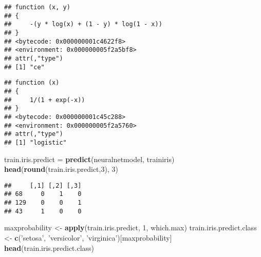 \documentclass[
]{book}
\newenvironment{Shaded}{\begin{snugshade}}{\end{snugshade}}
\newcommand{\DecValTok}[1]{\textcolor[rgb]{0.00,0.00,0.81}{#1}}
\newcommand{\KeywordTok}[1]{\textcolor[rgb]{0.13,0.29,0.53}{\textbf{#1}}}
\newcommand{\NormalTok}[1]{#1}
\newcommand{\OperatorTok}[1]{\textcolor[rgb]{0.81,0.36,0.00}{\textbf{#1}}}
\newcommand{\StringTok}[1]{\textcolor[rgb]{0.31,0.60,0.02}{#1}}
\begin{document}
\begin{Shaded}
\end{Shaded}

\begin{verbatim}
## function (x, y) 
## {
##     -(y * log(x) + (1 - y) * log(1 - x))
## }
## <bytecode: 0x000000001c4622f8>
## <environment: 0x000000005f2a5bf8>
## attr(,"type")
## [1] "ce"
\end{verbatim}

\begin{Shaded}
\end{Shaded}

\begin{verbatim}
## function (x) 
## {
##     1/(1 + exp(-x))
## }
## <bytecode: 0x000000001c45c288>
## <environment: 0x000000005f2a5760>
## attr(,"type")
## [1] "logistic"
\end{verbatim}

\begin{Shaded}
\begin{Highlighting}[]
\NormalTok{train.iris.predict =}\StringTok{ }\KeywordTok{predict}\NormalTok{(neuralnetmodel, trainiris)}
\KeywordTok{head}\NormalTok{(}\KeywordTok{round}\NormalTok{(train.iris.predict,}\DecValTok{3}\NormalTok{), }\DecValTok{3}\NormalTok{)}
\end{Highlighting}
\end{Shaded}

\begin{verbatim}
##     [,1] [,2] [,3]
## 68     0    1    0
## 129    0    0    1
## 43     1    0    0
\end{verbatim}

\begin{Shaded}
\begin{Highlighting}[]
\NormalTok{maxprobability <-}\StringTok{ }\KeywordTok{apply}\NormalTok{(train.iris.predict, }\DecValTok{1}\NormalTok{, which.max) }
\NormalTok{train.iris.predict.class <-}\StringTok{ }\KeywordTok{c}\NormalTok{(}\StringTok{'setosa'}\NormalTok{, }\StringTok{'versicolor'}\NormalTok{, }\StringTok{'virginica'}\NormalTok{)[maxprobability] }
\KeywordTok{head}\NormalTok{(train.iris.predict.class)}
\end{Highlighting}
\end{Shaded}
\end{document}
